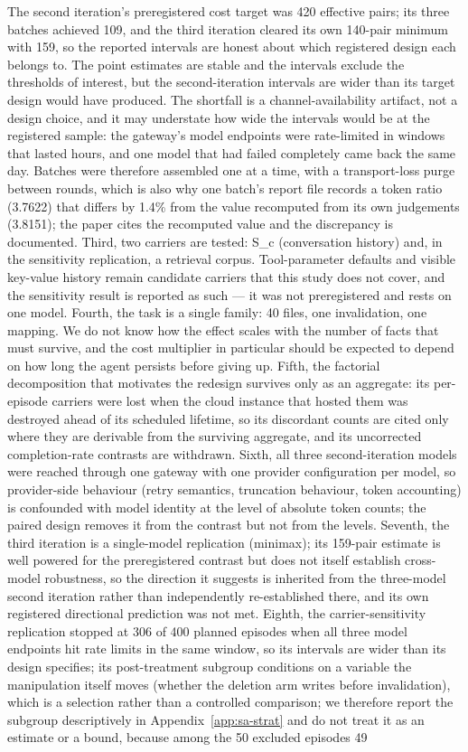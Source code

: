 \documentclass[11pt]{article}
\begin{document}
\begin{sloppypar}
The second iteration's preregistered cost target was 420 effective pairs; its three batches achieved 109, and the third iteration cleared its own 140-pair minimum with 159, so the reported intervals are honest about which registered design each belongs to. The point estimates are stable and the intervals exclude the thresholds of interest, but the second-iteration intervals are wider than its target design would have produced. The shortfall is a channel-availability artifact, not a design choice, and it may understate how wide the intervals would be at the registered sample: the gateway's model endpoints were rate-limited in windows that lasted hours, and one model that had failed completely came back the same day. Batches were therefore assembled one at a time, with a transport-loss purge between rounds, which is also why one batch's report file records a token ratio (3.7622) that differs by 1.4\% from the value recomputed from its own judgements (3.8151); the paper cites the recomputed value and the discrepancy is documented. Third, two carriers are tested: S\_c (conversation history) and, in the sensitivity replication, a retrieval corpus. Tool-parameter defaults and visible key-value history remain candidate carriers that this study does not cover, and the sensitivity result is reported as such --- it was not preregistered and rests on one model. Fourth, the task is a single family: 40 files, one invalidation, one mapping. We do not know how the effect scales with the number of facts that must survive, and the cost multiplier in particular should be expected to depend on how long the agent persists before giving up. Fifth, the factorial decomposition that motivates the redesign survives only as an aggregate: its per-episode carriers were lost when the cloud instance that hosted them was destroyed ahead of its scheduled lifetime, so its discordant counts are cited only where they are derivable from the surviving aggregate, and its uncorrected completion-rate contrasts are withdrawn. Sixth, all three second-iteration models were reached through one gateway with one provider configuration per model, so provider-side behaviour (retry semantics, truncation behaviour, token accounting) is confounded with model identity at the level of absolute token counts; the paired design removes it from the contrast but not from the levels. Seventh, the third iteration is a single-model replication (minimax); its 159-pair estimate is well powered for the preregistered contrast but does not itself establish cross-model robustness, so the direction it suggests is inherited from the three-model second iteration rather than independently re-established there, and its own registered directional prediction was not met. Eighth, the carrier-sensitivity replication stopped at 306 of 400 planned episodes when all three model endpoints hit rate limits in the same window, so its intervals are wider than its design specifies; its post-treatment subgroup conditions on a variable the manipulation itself moves (whether the deletion arm writes before invalidation), which is a selection rather than a controlled comparison; we therefore report the subgroup descriptively in Appendix~\ref{app:sa-strat} and do not treat it as an estimate or a bound, because among the 50 excluded episodes 49 
\end{sloppypar}
\end{document}
